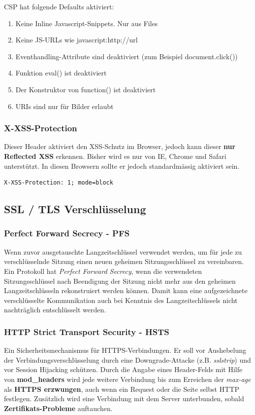 CSP hat folgende Defaults aktiviert:
\begin{enumerate}
	\item Keine Inline Javascript-Snippets. Nur aus Files 
	\item Keine JS-URLs wie javascript:http://url
	\item Eventhandling-Attribute sind deaktiviert (zum Beispiel document.click())
	\item Funktion eval() ist deaktiviert
	\item Der Konstruktor von function() ist deaktiviert
	\item URIs sind nur für Bilder erlaubt
\end{enumerate}

\subsubsection{X-XSS-Protection}
Dieser Header aktiviert den XSS-Schutz im Browser, jedoch kann dieser \textbf{nur Reflected XSS} erkennen. Bisher wird es nur von IE, Chrome und Safari unterstützt. In diesen Browsern sollte er jedoch standardmässig aktiviert sein.

\begin{lstlisting}[language={},caption=Beispiel des X-XSS-Protection Headers]
X-XSS-Protection: 1; mode=block
\end{lstlisting}

\subsection{SSL / TLS Verschlüsselung}

\subsubsection{Perfect Forward Secrecy - PFS}
Wenn zuvor ausgetauschte Langzeitschlüssel verwendet werden, um für jede zu verschlüsselnde Sitzung einen neuen geheimen Sitzungsschlüssel zu vereinbaren. Ein Protokoll hat \textit{Perfect Forward Secrecy}, wenn die verwendeten Sitzungsschlüssel nach Beendigung der Sitzung nicht mehr aus den geheimen Langzeitschlüsseln rekonstruiert werden können. Damit kann eine aufgezeichnete verschlüsselte Kommunikation auch bei Kenntnis des Langzeitschlüssels nicht nachträglich entschlüsselt werden.

\subsubsection{HTTP Strict Transport Security - HSTS}
Ein Sicherheitsmechanismus für HTTPS-Verbindungen. Er soll vor Aushebelung der Verbindungsverschlüsselung durch eine Downgrade-Attacke (z.B. \textit{sslstrip}) und vor Session Hijacking schützen. Durch die Angabe eines Header-Felds mit Hilfe von \textbf{mod\_headers} wird jede weitere Verbindung bis zum Erreichen der \textit{max-age} als \textbf{HTTPS erzwungen}, auch wenn ein Request oder die Seite selbst HTTP festlegen. Zusätzlich wird eine Verbindung mit dem Server unterbunden, sobald \textbf{Zertifikats-Probleme} auftauchen.\\


